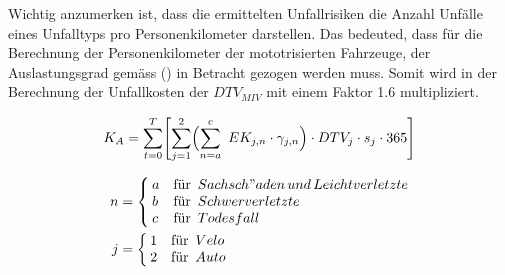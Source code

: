 \begin{IMleftrightskip}
Wichtig anzumerken ist, dass die ermittelten Unfallrisiken die Anzahl Unfälle eines Unfalltyps pro Personenkilometer darstellen. Das bedeuted, dass für die Berechnung der Personenkilometer der mototrisierten Fahrzeuge, der Auslastungsgrad gemäss (\cite{Mikrozensus2015}) in Betracht gezogen werden muss. Somit wird in der Berechnung der Unfallkosten der $DTV_{MIV}$ mit einem Faktor 1.6 multipliziert.
\end{IMleftrightskip}

\begin{equation}
K_{A} = \sum_{t=0}^T \Biggl[ \sum_{j=1}^2 \Bigl( \sum_{n=a}^c \ EK_{j,n} \cdot \gamma_{j,n} \Bigr) \cdot DTV_{j} \cdot s_j \cdot 365 \Biggr] 
\label{eq.10}
\end{equation}

\begin{align*}
      n &=
      \begin{cases}
        \begin{aligned}
          & a  \\
          & b \\
          & c
        \end{aligned} &
        \begin{aligned}
         & \text{für}\ \thinspace \\
         & \text{für}\ \thinspace \\
         & \text{für}\ \thinspace
        \end{aligned}
        \begin{aligned}
          & {Sachsch"aden\,und\,Leichtverletzte} \\
          & {Schwerverletzte} \\
          & {Todesfall}
        \end{aligned}
      \end{cases}  \\
      j &=
      \begin{cases}
        \begin{aligned}
          & 1 \\
          & 2
        \end{aligned} &
        \begin{aligned}
         & \text{für}\ \thinspace \\
         & \text{für}\ \thinspace
        \end{aligned}
        \begin{aligned}
          & Velo \\
          & Auto
        \end{aligned}
      \end{cases} \\
\end{align*}

